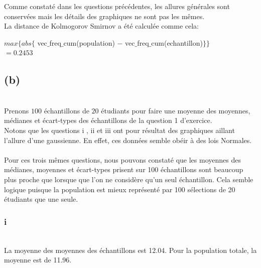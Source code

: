 \documentclass[10pt,a4paper]{article}
\begin{document}
Comme constaté dans les questions précédentes, les allures générales sont conservées mais les détails des graphiques ne sont pas les mêmes.
\ \\ 

La distance de Kolmogorov Smirnov a été calculée comme cela:

\begin{center}

$max\{ abs\{$ vec$\_$freq$\_$cum(population) $-$ vec$\_$freq$\_$cum(echantillon)$\} \}$
\ \\

$ =0.2453$ 
\end{center}



\subsection*{(b)}
\ \\

Prenons $100$ échantillons de $20$ étudiants pour faire une moyenne des moyennes, médianes et écart-types des échantillons de la question 1 d'exercice. 
\ \\
 
Notons que les questions i , ii et iii ont pour résultat des graphiques aillant l'allure d'une gaussienne. En effet, ces données semble obéir à des lois Normales. 
\ \\

Pour ces trois mêmes questions, nous pouvons constaté que les moyennes des médianes, moyennes et écart-types prisent sur 100 échantillons sont beaucoup plus proche que lorsque que l'on ne considère qu'un seul échantillon. Cela semble logique puisque la population est mieux représenté par 100 sélections de 20 étudiants que une seule.


\subsubsection*{i}
\ \\

La moyenne des moyennes des échantillons est 12.04. Pour la population totale, la moyenne est de 11.96. 
\end{document}
